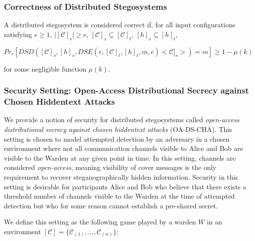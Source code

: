 \documentclass{article}
\begin{document}
\subsubsection{Correctness of Distributed Stegosystems}

A distributed stegosystem is considered correct if, for all input configurations satisfying $e \geq 1$, $\lvert [\mathcal{C}]_s \rvert \geq e$, 
$[\mathcal{C}]_s \subseteq [\mathcal{C}]_t$, $[h]_s \subseteq [h]_t$,

\[ Pr_r[DSD([\mathcal{C}]_s, [h]_s, DSE(r, [\mathcal{C}]_t, [h]_t, m, e)<\mathcal{C}]_s>) = m] \geq 1 - \mu(k) \]

\noindent for some negligible function $\mu(k)$.

\subsubsection{Security Setting: Open-Access Distributional Secrecy against Chosen Hiddentext Attacks}

We provide a notion of security for distributed stegosystems called 
\textit{open-access distributional secrecy against chosen hiddentext attacks} (OA-DS-CHA).  This setting is chosen to model attempted detection by 
an adversary in a chosen environment where not all communication channels visible to Alice and Bob are visible to the Warden at any given 
point in time.  In this setting, channels 
are considered \textit{open-access}, meaning visibility of cover messages is the only requirement to recover steganographically hidden information.
Security in this setting is desirable for participants Alice and Bob who believe that there exists a threshold 
number of channels visible to the Warden at the time of attempted detection but who for some reason cannot establish a pre-shared secret.

We define this setting as the following game played by a 
warden $W$ in an environment $[\mathcal{C}] = \{ \mathcal{C}_{(1)}, ..., \mathcal{C}_{(w)} \}$:
\end{document}
